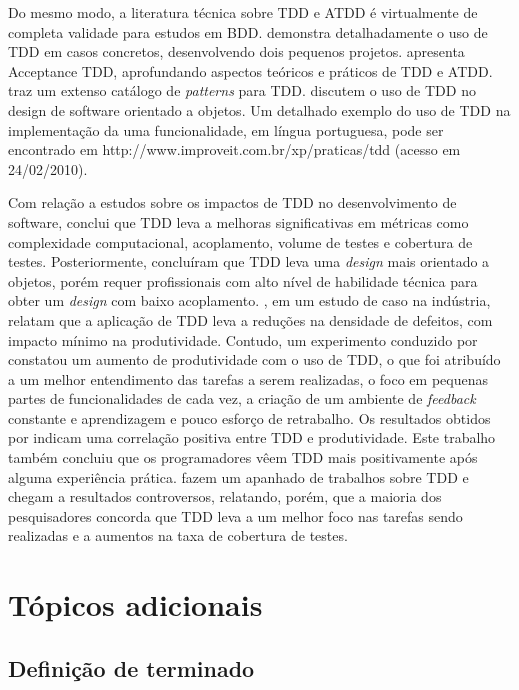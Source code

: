 \documentclass[a4paper,abntfigtabnum,noindentfirst]{abnt}
\begin{document}
Do mesmo modo, a literatura técnica sobre TDD e ATDD é virtualmente de completa validade para estudos em BDD.   demonstra detalhadamente o uso de TDD em casos concretos, desenvolvendo dois pequenos projetos.  apresenta Acceptance TDD, aprofundando aspectos teóricos e práticos de TDD e ATDD.  traz um extenso catálogo de \textit{patterns} para TDD.  discutem o uso de TDD no design de software orientado a objetos. Um detalhado exemplo do uso de TDD na implementação da uma funcionalidade, em língua portuguesa, pode ser encontrado em http://www.improveit.com.br/xp/praticas/tdd (acesso em 24/02/2010).

Com relação a estudos sobre os impactos de TDD no desenvolvimento de software,  conclui que TDD leva a melhoras significativas em métricas como complexidade computacional, acoplamento, volume de testes e cobertura de testes. Posteriormente,  concluíram que TDD leva uma \textit{design} mais orientado a objetos, porém requer profissionais com alto nível de habilidade técnica para obter um \textit{design} com baixo acoplamento. , em um estudo de caso na indústria, relatam que a aplicação de TDD leva a reduções na densidade de defeitos, com impacto mínimo na produtividade. Contudo, um experimento conduzido por  constatou um aumento de produtividade com o uso de TDD, o que foi atribuído a um melhor entendimento das tarefas a serem realizadas, o foco em pequenas partes de funcionalidades de cada vez, a criação de um ambiente de \textit{feedback} constante e aprendizagem e pouco esforço de retrabalho. Os resultados obtidos por  indicam uma correlação positiva entre TDD e produtividade. Este trabalho também concluiu que os programadores vêem TDD mais positivamente após alguma experiência prática.  fazem um apanhado de trabalhos sobre TDD e chegam a resultados controversos, relatando, porém, que a maioria dos pesquisadores concorda que TDD leva a um melhor foco nas tarefas sendo realizadas e a aumentos na taxa de cobertura de testes.

\section{Tópicos adicionais}

\subsection{Definição de terminado}
\end{document}
